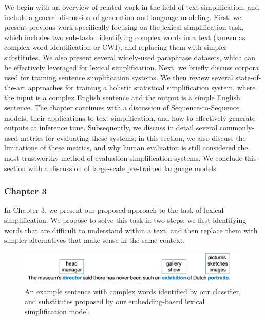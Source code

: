 \documentclass[thesis.tex]{subfiles}
\begin{document}
We begin with an overview of related work in the field of text simplification, and include a general discussion of generation and language modeling. First, we present previous work specifically focusing on the lexical simplification task, which includes two sub-tasks: identifying complex words in a text (known as complex word identification or CWI), and replacing them with simpler substitutes. We also present several widely-used paraphrase datasets, which can be effectively leveraged for lexical simplification. Next, we briefly discuss corpora used for training sentence simplification systems. We then review several state-of-the-art approaches for training a holistic statistical simplification system, where the input is a complex English sentence and the output is a simple English sentence. The chapter continues with a discussion of Sequence-to-Sequence models, their applications to text simplification, and how to effectively generate outputs at inference time. Subsequently, we discuss in detail several commonly-used metrics for evaluating these systems; in this section, we also discuss the limitations of these metrics, and why human evaluation is still considered the most trustworthy method of evaluation simplification systems. We conclude this section with a discussion of large-scale pre-trained language models.

\subsubsection{Chapter 3}

In Chapter 3, we present our proposed approach to the task of lexical simplification.
We propose to solve this task in two steps: we first identifying words that are difficult to understand within a text, and then replace them with simpler alternatives that make sense in the same context.

\begin{figure}[H]
    \centering
\includegraphics[width=0.8\linewidth]{pictures/lex_example.png}
\caption{An example sentence with complex words identified by our classifier, and substitutes proposed by our embedding-based lexical simplification model.}
\label{fig:lex_example}
\end{figure}
\end{document}
